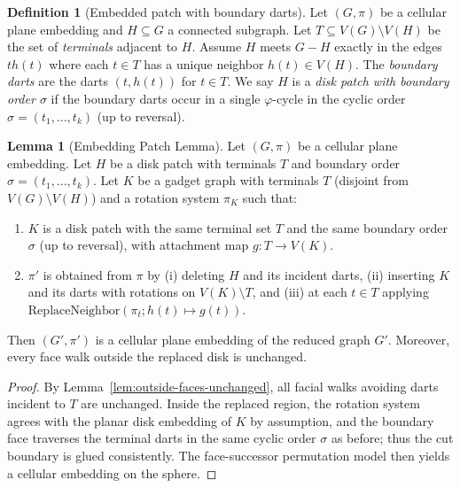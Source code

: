 \documentclass[12pt]{article}
\theoremstyle{definition}
\newtheorem{lemma}[theorem]{Lemma}
\newtheorem{definition}[theorem]{Definition}
\begin{document}
\begin{definition}[Embedded patch with boundary darts]
\label{def:patch}
Let $(G,\pi)$ be a cellular plane embedding and $H\subseteq G$ a connected subgraph.
Let $T\subseteq V(G)\setminus V(H)$ be the set of \emph{terminals} adjacent to $H$.
Assume $H$ meets $G-H$ exactly in the edges $t h(t)$ where each $t\in T$ has a unique neighbor $h(t)\in V(H)$.
The \emph{boundary darts} are the darts $(t,h(t))$ for $t\in T$.
We say $H$ is a \emph{disk patch with boundary order $\sigma$} if the boundary darts occur in a single
$\varphi$-cycle in the cyclic order $\sigma=(t_1,\dots,t_k)$ (up to reversal).
\end{definition}

\begin{lemma}[Embedding Patch Lemma]
\label{lem:embedding-patch}
Let $(G,\pi)$ be a cellular plane embedding. Let $H$ be a disk patch with terminals $T$ and boundary order
$\sigma=(t_1,\dots,t_k)$.
Let $K$ be a gadget graph with terminals $T$ (disjoint from $V(G)\setminus V(H)$) and a rotation system $\pi_K$
such that:
\begin{enumerate}
  \item $K$ is a disk patch with the same terminal set $T$ and the same boundary order $\sigma$
        (up to reversal), with attachment map $g:T\to V(K)$.
  \item $\pi'$ is obtained from $\pi$ by (i) deleting $H$ and its incident darts,
        (ii) inserting $K$ and its darts with rotations on $V(K)\setminus T$,
        and (iii) at each $t\in T$ applying $\mathrm{ReplaceNeighbor}(\pi_t;h(t)\mapsto g(t))$.
\end{enumerate}
Then $(G',\pi')$ is a cellular plane embedding of the reduced graph $G'$.
Moreover, every face walk outside the replaced disk is unchanged.
\end{lemma}
\begin{proof}
By Lemma~\ref{lem:outside-faces-unchanged}, all facial walks avoiding darts incident to $T$ are unchanged.
Inside the replaced region, the rotation system agrees with the planar disk embedding of $K$ by assumption,
and the boundary face traverses the terminal darts in the same cyclic order $\sigma$ as before; thus the cut boundary
is glued consistently. The face-successor permutation model then yields a cellular embedding on the sphere.
\end{proof}

\end{document}
